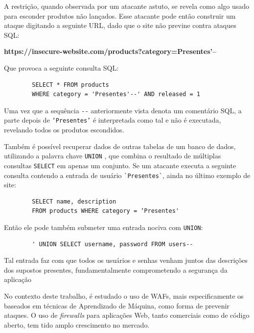 \begin{alineas}
    A restrição, quando observada por um atacante astuto, se revela como algo usado para esconder produtos não lançados. Esse atacante pode então construir um ataque digitando a seguinte URL, dado que o site não previne contra ataques SQL:
        
    \textbf{https://insecure-website.com/products?category=Presentes’--}
    
    Que provoca a seguinte consulta SQL:
    
    \begin{verbatim}
        SELECT * FROM products 
        WHERE category = 'Presentes'--' AND released = 1 
    \end{verbatim}
    
     Uma vez que a sequência \verb+--+ anteriormente vista denota um comentário SQL, a parte depois de 
    \verb+‘Presentes’+ é interpretada como tal e não é executada, revelando todos os produtos escondidos.

    \item
    Também é possível recuperar dados de outras tabelas de um banco de dados, utilizando a palavra chave \verb+UNION+ \cite{mysql_union}, que combina o resultado de múltiplas consultas \verb+SELECT+ em apenas um conjunto. Se um atacante executa a seguinte consulta contendo a entrada de usuário \verb+`Presentes`+, ainda no último exemplo de site:
    
    \begin{verbatim}
        SELECT name, description
        FROM products WHERE category = ‘Presentes'
    \end{verbatim}
    
    Então ele pode também submeter uma entrada nociva com \verb+UNION+:
    
    \begin{verbatim}
        ' UNION SELECT username, password FROM users--
    \end{verbatim}
        
    Tal entrada faz com que todos os usuários e senhas venham juntos das descrições dos supostos presentes, fundamentalmente comprometendo a segurança da aplicação

\end{alineas}


No contexto deste trabalho, é estudado o uso de WAFs, mais especificamente os baseados em técnicas de Aprendizado de Máquina, como forma de prevenir ataques. O uso de \textit{firewalls} para aplicações Web, tanto comerciais como de código aberto, tem tido amplo crescimento no mercado.


